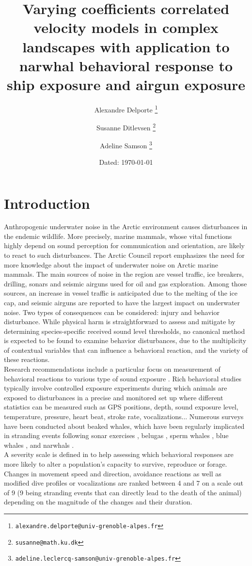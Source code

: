 \documentclass[11pt]{article}
\title{
 \textbf{Varying coefficients correlated velocity models in complex landscapes with application to narwhal behavioral response to ship exposure and airgun exposure}}
\author{Alexandre Delporte%
	\thanks{\texttt{alexandre.delporte@univ-grenoble-alpes.fr}} }
\affil{Laboratoire Jean Kuntzmann, Université Grenoble-Alpes, France}
\author{Susanne Ditlevsen%
\thanks{\texttt{susanne@math.ku.dk}}}
\affil{Department of Statistics, University of Copenhagen, Denmark}
\author{Adeline Samson%
	\thanks{\texttt{adeline.leclercq-samson@univ-grenoble-alpes.fr}}}
\affil{Laboratoire Jean Kuntzmann, Université Grenoble-Alpes, France}
\date{Dated: \today}
\newcommand {\1}{\mathbb{1}}
\begin{document}
\maketitle


\newpage

\section{Introduction}


Anthropogenic underwater noise in the Arctic environment causes disturbances in the endemic wildlife. More precisely, marine mammals, whose vital functions highly depend on sound perception for communication and orientation, are likely to react to such disturbances. The Arctic Council report \cite{halliday_underwater_2020} emphasizes the need for more knowledge about the impact of underwater noise on Arctic marine mammals. The main sources of noise in the region are vessel traffic, ice breakers, drilling, sonars and seismic airguns used for oil and gas exploration. Among those sources, an increase in vessel traffic is anticipated due to the melting of the ice cap, and seismic airguns are reported to have the largest impact on underwater noise. Two types of consequences can be considered: injury and behavior disturbance. While physical harm is straightforward to assess and mitigate by determining species-specific received sound level thresholds, no canonical method is expected to be found to examine behavior disturbances, due to the multiplicity of contextual variables that can influence a behavioral reaction, and the variety of these reactions.\\
Research recommendations include a particular focus on measurement of behavioral reactions to various type of sound exposure \cite{southall_marine_2008,southall_marine_2019}. Rich behavioral studies typically involve controlled exposure experiments during which animals are exposed to disturbances in a precise and monitored set up where different  statistics can be measured such as GPS positions, depth, sound exposure level, temperature, pressure, heart beat, stroke rate, vocalizations... Numerous surveys have been conducted about beaked whales, which have been regularly implicated in stranding events following sonar exercises \cite{tyack_beaked_2011,cioffi_trade-offs_2022}, belugas \cite{martin_exposure_2023}, sperm whales \cite{madsen_quantitative_2006}, blue whales \cite{friedlaender_preymediated_2016}, and narwhals \cite{heide-jorgensen_behavioral_2021,tervo_narwhals_2021}. \\
A severity scale is defined in \cite{southall_marine_2008} to help assessing which behavioral responses are more likely to alter a population's capacity to survive, reproduce or forage. Changes in movement speed and direction, avoidance reactions as well as modified dive profiles or vocalizations  are ranked between 4 and 7 on a scale out of 9 (9 being stranding events that can directly lead to the death of the animal) depending on the magnitude of the changes and their duration.\\
\end{document}

